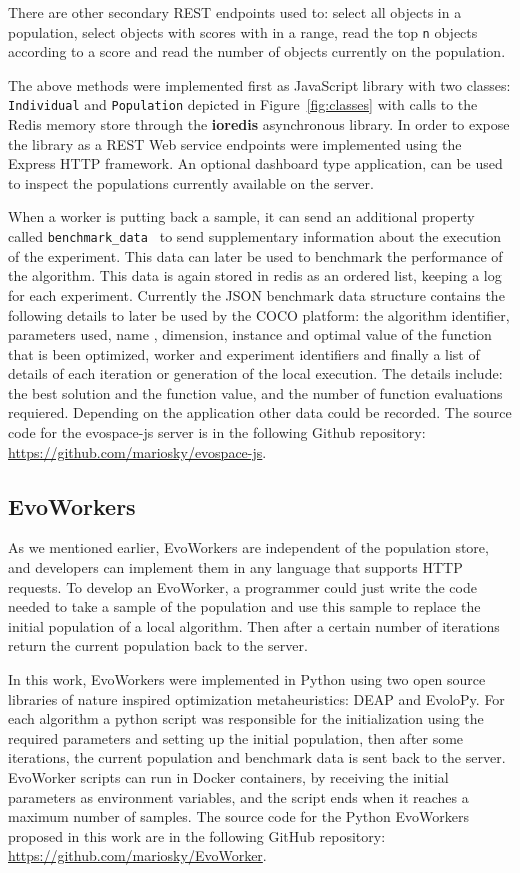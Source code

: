 There are other secondary REST endpoints used to: select all objects in a 
population, select objects with scores with in a range, read the 
top {\tt n} objects according to a score and read the number of
objects currently on the population.      

The above methods were implemented first as JavaScript library 
with two classes: {\tt Individual} and {\tt Population} depicted 
in Figure~\ref{fig:classes} with calls to the Redis memory store 
through the {\bf ioredis} 
asynchronous library. In order to expose the library as a 
REST Web service endpoints were implemented using the Express HTTP framework. 
An optional dashboard type application, can be used to inspect 
the populations currently available on the server.


When a worker is putting back a sample, it can send 
an additional property called {\tt benchmark\_data }
to send supplementary information about the execution 
of the experiment.  This data can later be used to 
benchmark the performance of the algorithm. This 
data is again stored in redis as an ordered list, 
keeping a log for each experiment. Currently the JSON 
benchmark data structure contains the following details 
to later be used by the COCO platform: the algorithm identifier, 
parameters used, name , dimension, instance and optimal value 
of the function that is been optimized, worker and experiment 
identifiers and finally a list of details of each iteration 
or generation of the local execution. The details include:
the best solution and the function value, and the number of
function evaluations requiered. Depending on the application
other data could be recorded. The source code for the {\sf evospace-js}
server is in the following Github repository: 
\url{https://github.com/mariosky/evospace-js}.


\subsection{EvoWorkers}
\label{sec:evoworkers}
As we mentioned earlier, EvoWorkers are independent of 
the population store, and developers can implement them 
in any language that supports HTTP requests. To develop an 
EvoWorker, a programmer could just write the code needed to 
take a sample of the population and use this sample to 
replace the initial population of a local algorithm. 
Then after a certain number of iterations return the 
current population back to the server.

In this work, EvoWorkers were implemented in Python 
using two open source libraries of nature inspired optimization 
metaheuristics:  DEAP and EvoloPy. For each algorithm a 
python script was responsible for the initialization using 
the required parameters and setting up the initial population, 
then after some iterations, the current population and 
benchmark data is sent back to the server. EvoWorker 
scripts can run in Docker containers, by receiving 
the initial parameters as environment variables, and 
the script ends when it reaches a maximum number of samples.
The source code for the Python EvoWorkers
proposed in this work are in the following GitHub repository: 
\url{https://github.com/mariosky/EvoWorker}.

